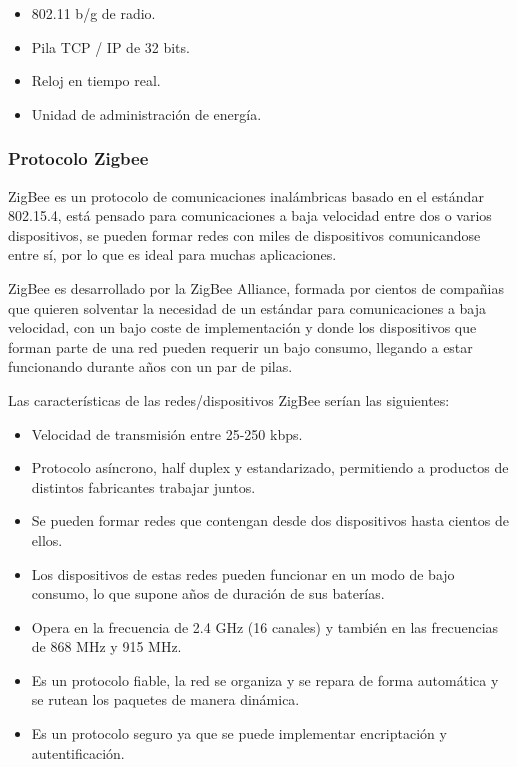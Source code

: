 				\begin{itemize}	
					
					\item 802.11 b/g de radio.
					
					\item Pila TCP / IP de 32 bits.
					
					\item Reloj en tiempo real.
					
					\item Unidad de administración de energía.
					
				\end{itemize}
				
				
				
			\subsubsection{Protocolo Zigbee}
			
				ZigBee es un protocolo de comunicaciones inalámbricas basado en el estándar 802.15.4, está pensado para comunicaciones a baja velocidad entre dos o varios dispositivos, se pueden formar redes con miles de dispositivos comunicandose entre sí, por lo que es ideal para muchas aplicaciones.
				
				ZigBee es desarrollado por la ZigBee Alliance, formada por cientos de compañias que quieren solventar la necesidad de un estándar para comunicaciones a baja velocidad, con un bajo coste de implementación y donde los dispositivos que forman parte de una red pueden requerir un bajo consumo, llegando a estar funcionando durante años con un par de pilas.
				
				Las características de las redes/dispositivos ZigBee serían las siguientes:
				
				\begin{itemize}
				\item Velocidad de transmisión entre 25-250 kbps.
				\item Protocolo asíncrono, half duplex y estandarizado, permitiendo a productos de distintos fabricantes trabajar juntos.
				\item Se pueden formar redes que contengan desde dos dispositivos hasta cientos de ellos.
				\item Los dispositivos de estas redes pueden funcionar en un modo de bajo consumo, lo que supone años de duración de sus baterías.
				\item Opera en la frecuencia de 2.4 GHz (16 canales) y también en las frecuencias de 868 MHz y 915 MHz.
				\item Es un protocolo fiable, la red se organiza y se repara de forma automática y se rutean los paquetes de manera dinámica.
				\item Es un protocolo seguro ya que se puede implementar encriptación y autentificación.
				\end{itemize}
				
